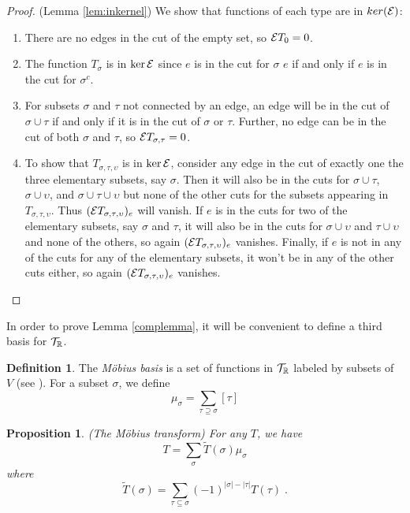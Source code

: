 \documentclass[12pt]{article}
\newtheorem{proposition}[theorem]{Proposition}
\theoremstyle{definition}
\newtheorem{definition}[theorem]{Definition}
\begin{document}
\begin{proof} (Lemma \ref{lem:inkernel})
We show that functions of each type are in $ker({\cal E})$:
\vspace{-0.3cm}
    \begin{enumerate}
    \item There are no edges in the cut of the empty set, so ${\cal E} T_0 = 0$.
    \item The function $T_\sigma$ is in $\ker {\cal E}$ since $e$ is in the cut for $\sigma$ $e$ if and only if $e$ is in the cut for $\sigma^c$.
    \item For subsets $\sigma$ and $\tau$ not connected by an edge, an edge will be in the cut of $\sigma \cup \tau$ if and only if it is in the cut of $\sigma$ or $\tau$. Further, no edge can be in the cut of both $\sigma$ and $\tau$, so ${\cal E} T_{\sigma, \tau} = 0$.
    \item  To show that $T_{\sigma, \tau, \upsilon}$ is in $\ker {\cal E}$, consider any edge in the cut of exactly one the three elementary subsets, say $\sigma$. Then it will also be in the cuts for $\sigma \cup \tau$, $\sigma \cup \upsilon$, and $\sigma \cup \tau \cup \upsilon$ but none of the other cuts for the subsets appearing in $T_{\sigma, \tau, \upsilon}$. Thus $({\cal E} T_{\sigma, \tau, \upsilon})_e$ will vanish. If $e$ is in the cuts for two of the elementary subsets, say $\sigma$ and $\tau$, it will also be in the cuts for $\sigma \cup \upsilon$ and $\tau \cup \upsilon$ and none of the others, so again $({\cal E} T_{\sigma, \tau, \upsilon})_e$  vanishes. Finally, if $e$ is not in any of the cuts for any of the elementary subsets, it won't be in any of the other cuts either, so again $({\cal E} T_{\sigma, \tau, \upsilon})_e$ vanishes.
\end{enumerate}
\end{proof}
In order to prove Lemma \ref{complemma}, it will be convenient to define a third basis for ${\cal T}_\mathbb{R}$.
\begin{definition}
The {\it Möbius basis} is a set of functions in ${\cal T}_\mathbb{R}$ labeled by subsets of $V$ (see \cite{Rota1964,Stanley2011}). For a subset $\sigma$, we define 
\[
\mu_\sigma = \sum_{\tau \supseteq \sigma} [\tau] 
\]
\end{definition}
\begin{proposition}(The Möbius transform)
For any $T$, we have 
\begin{equation}
\label{Möbius}
T = \sum_\sigma \tilde{T}(\sigma) \mu_\sigma
\end{equation}
where
\begin{equation}
\label{defMob}
\tilde{T}(\sigma) = \sum_{\tau \subseteq \sigma}(-1)^{|\sigma| - |\tau|} T(\tau) \; .
\end{equation}
\end{proposition}
\end{document}
